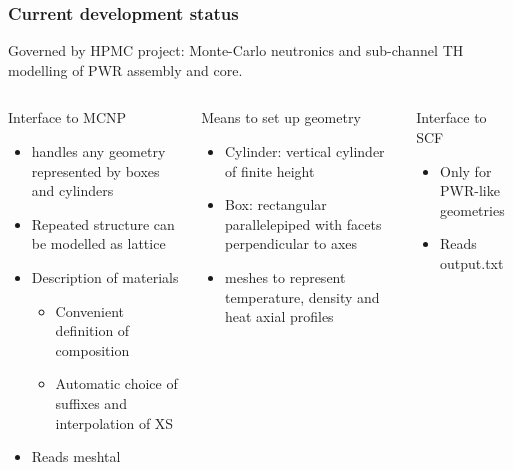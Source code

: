 \documentclass[t]{beamer}
\begin{document}
\begin{frame}\frametitle{Current development status}
    Governed by HPMC project: Monte-Carlo neutronics and sub-channel TH modelling of PWR assembly and core.

    
    \begin{columns}
    \begin{block}{Interface to MCNP}
        \begin{itemize}
            \item handles any geometry represented by boxes and cylinders
            \item Repeated structure can be modelled as lattice 
            \item Description of materials
                \begin{itemize}
                    \item Convenient definition of composition
                    \item Automatic choice of suffixes and interpolation of XS
                \end{itemize}
            \item Reads meshtal
        \end{itemize}
    \end{block}

    \begin{block}{Means to set up geometry} 
        \begin{itemize}
            \item Cylinder: vertical cylinder of finite height
            \item Box: rectangular parallelepiped with facets perpendicular to axes
            \item meshes to represent temperature, density and heat axial profiles
        \end{itemize}
    \end{block}
    \begin{block}{Interface to SCF}
        \begin{itemize}
            \item Only for PWR-like geometries
            \item Reads output.txt
        \end{itemize}
    \end{block}
    \end{columns}

\end{frame}
\end{document}
